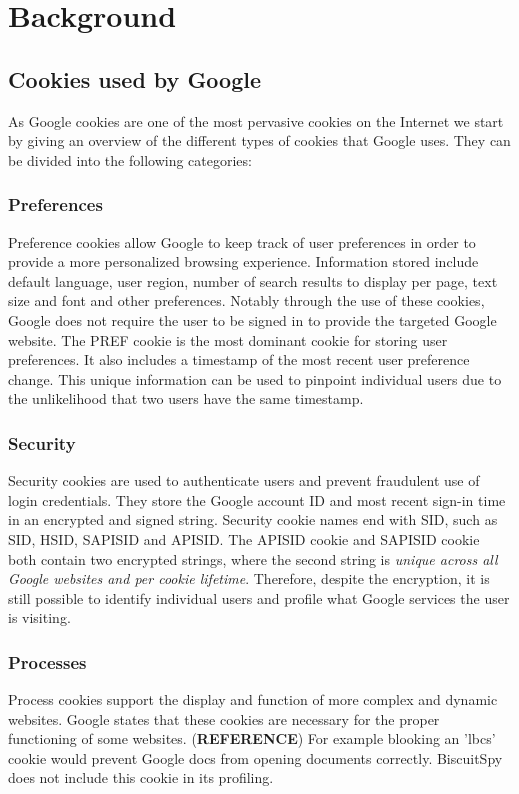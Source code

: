 \section{Background}
\label{sec:background} 

\subsection{Cookies used by Google}
As Google cookies are one of the most pervasive cookies on the Internet we start by giving an overview of the different types of cookies that Google uses. They can be divided into the following categories:

\subsubsection{Preferences}
Preference cookies allow Google to keep track of user preferences in order to provide a more personalized browsing experience. Information stored include default language, user region, number of search results to display per page, text size and font and other preferences. Notably through the use of these cookies, Google does not require the user to be signed in to provide the targeted Google website. The PREF cookie is the most dominant cookie for storing user preferences. It also includes a timestamp of the most recent user preference change. This unique information can be used to pinpoint individual users due to the unlikelihood that two users have the same timestamp.

\subsubsection{Security}
Security cookies are used to authenticate users and prevent fraudulent use of login credentials. They store the Google account ID and most recent sign-in time in an encrypted and signed string. Security cookie names end with SID, such as SID, HSID, SAPISID and APISID. The APISID cookie and SAPISID cookie both contain two encrypted strings, where the second string is \emph{unique across all Google websites and per cookie lifetime}. Therefore, despite the encryption, it is still possible to identify individual users and profile what Google services the user is visiting.

\subsubsection{Processes}
Process cookies support the display and function of more complex and dynamic websites. Google states that these cookies are necessary for the proper functioning of some websites. (\textbf{REFERENCE}) For example blooking an 'lbcs' cookie would prevent Google docs from opening documents correctly. BiscuitSpy does not include this cookie in its profiling.

